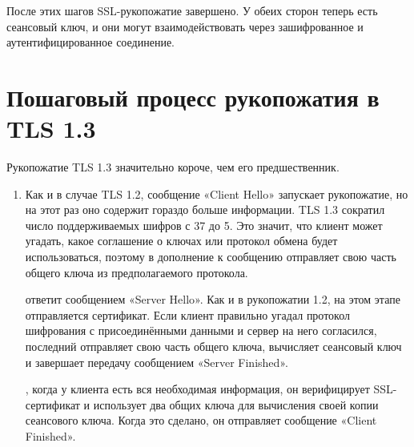 После этих шагов SSL-рукопожатие завершено. У обеих сторон теперь есть сеансовый ключ, и они могут взаимодействовать через зашифрованное и аутентифицированное соединение.


\section{Пошаговый процесс рукопожатия в TLS 1.3}


Рукопожатие TLS 1.3 значительно короче, чем его предшественник.

\begin{enumerate}
	\item
	Как и в случае TLS 1.2, сообщение «Client Hello» запускает рукопожатие, но на этот раз оно содержит гораздо больше информации. TLS 1.3 сократил число поддерживаемых шифров с 37 до 5. Это значит, что клиент может угадать, какое соглашение о ключах или протокол обмена будет использоваться, поэтому в дополнение к сообщению отправляет свою часть общего ключа из предполагаемого протокола.
	
	 ответит сообщением «Server Hello». Как и в рукопожатии 1.2, на этом этапе отправляется сертификат. Если клиент правильно угадал протокол шифрования с присоединёнными данными и сервер на него согласился, последний отправляет свою часть общего ключа, вычисляет сеансовый ключ и завершает передачу сообщением «Server Finished».
	
	, когда у клиента есть вся необходимая информация, он верифицирует SSL-сертификат и использует два общих ключа для вычисления своей копии сеансового ключа. Когда это сделано, он отправляет сообщение «Client Finished».
	
\end{enumerate}



